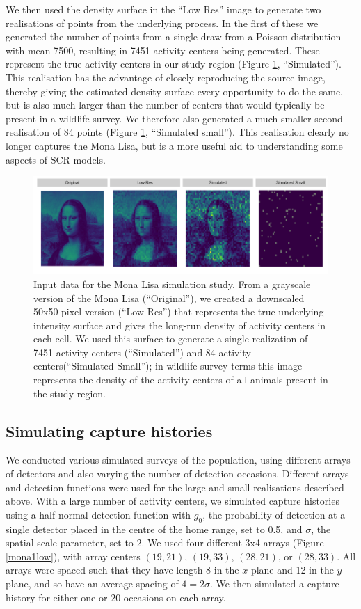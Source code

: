 \documentclass[a4paper,12pt]{article}
\begin{document}
We then used the density surface in the ``Low Res'' image to generate two realisations of points from the underlying process. In the first of these we generated the number of points from a single draw from a Poisson distribution with mean 7500, resulting in 7451 activity centers being generated. These represent the true activity centers in our study region (Figure \ref{mlinputs}, ``Simulated''). This realisation has the advantage of closely reproducing the source image, thereby giving the estimated density surface every opportunity to do the same, but is also much larger than the number of centers that would typically be present in a wildlife survey. We therefore also generated a much smaller second realisation of 84 points (Figure \ref{mlinputs}, ``Simulated small''). This realisation clearly no longer captures the Mona Lisa, but is a more useful aid to understanding some aspects of SCR models.

\begin{figure}[htbp]
\centering
\includegraphics[width=1\textwidth]{mona_inputdata}
\caption{Input data for the Mona Lisa simulation study. From a grayscale version of the Mona Lisa (``Original''), we created a downscaled 50x50 pixel version (``Low Res'') that represents the true underlying intensity surface and gives the long-run density of activity centers in each cell. We used this surface to generate a single realization of 7451 activity centers (``Simulated'') and 84 activity centers(``Simulated Small''); in wildlife survey terms this image represents the density of the activity centers of all animals present in the study region.}
\label{mlinputs}
\end{figure}

\subsection{Simulating capture histories} \label{s:simcapthist}

We conducted various simulated surveys of the population, using different arrays of detectors and also varying the number of detection occasions. Different arrays and detection functions were used for the large and small realisations described above. With a large number of activity centers, we simulated capture histories using a half-normal detection function with $g_0$, the probability of detection at a single detector placed in the centre of the home range, set to 0.5, and $\sigma$, the spatial scale parameter, set to 2. We used four different 3x4 arrays (Figure \ref{mona1low}), with array centers $(19,21)$, $(19,33)$, $(28, 21)$, or $(28, 33)$. All arrays were spaced such that they have length 8 in the $x$-plane and 12 in the $y$-plane, and so have an average spacing of $4=2\sigma$. We then simulated a capture history for either one or 20 occasions on each array.
\end{document}
